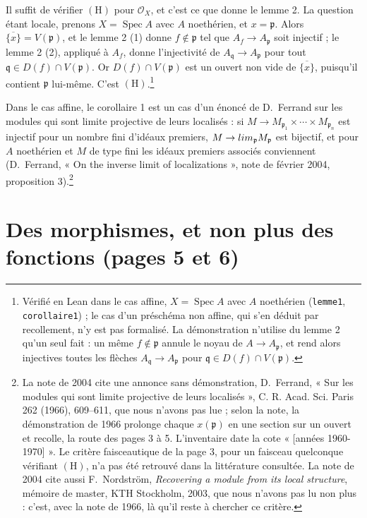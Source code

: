 \documentclass[11pt,a4paper]{article}
\begin{document}
Il suffit de vérifier $(\mathrm{H})$ pour $\mathcal{O}_X$, et c'est ce que
donne le lemme 2. La question étant locale, prenons $X = \operatorname{Spec} A$ avec
$A$ noethérien, et $x = \mathfrak p$. Alors $\overline{\{x\}} = V(\mathfrak p)$,
et le lemme 2 (1) donne $f \notin \mathfrak p$ tel que
$A_f \to A_{\mathfrak p}$ soit injectif ; le lemme 2 (2), appliqué à $A_f$,
donne l'injectivité de $A_{\mathfrak q} \to A_{\mathfrak p}$ pour tout
$\mathfrak q \in D(f) \cap V(\mathfrak p)$. Or $D(f) \cap V(\mathfrak p)$ est
un ouvert non vide de $\overline{\{x\}}$, puisqu'il contient $\mathfrak p$
lui-même. C'est $(\mathrm{H})$.\footnote{Vérifié en Lean dans le cas
affine, $X = \operatorname{Spec} A$ avec $A$ noethérien
(\texttt{lemme1}, \texttt{corollaire1}) ; le cas d'un préschéma non affine,
qui s'en déduit par recollement, n'y est pas formalisé. La démonstration
n'utilise du lemme 2 qu'un seul fait : un même $f \notin \mathfrak p$ annule
le noyau de $A \to A_{\mathfrak p}$, et rend alors injectives toutes les
flèches $A_{\mathfrak q} \to A_{\mathfrak p}$ pour
$\mathfrak q \in D(f) \cap V(\mathfrak p)$.}

Dans le cas affine, le corollaire 1 est un cas d'un énoncé de D.~Ferrand sur
les modules qui sont limite projective de leurs localisés : si
$M \to M_{\mathfrak p_1} \times \cdots \times M_{\mathfrak p_n}$ est
injectif pour un nombre fini d'idéaux premiers, $M \to
\varprojlim_{\mathfrak p} M_{\mathfrak p}$ est bijectif, et pour $A$
noethérien et $M$ de type fini les idéaux premiers associés conviennent
(D.~Ferrand, « On the inverse limit of localizations », note de février
2004, proposition 3).\footnote{La note de 2004 cite une annonce sans
démonstration, D.~Ferrand, « Sur les modules qui sont limite projective de
leurs localisés », C. R. Acad. Sci. Paris 262 (1966), 609--611, que nous
n'avons pas lue ; selon la note, la démonstration de 1966 prolonge chaque
$x(\mathfrak p)$ en une section sur un ouvert et recolle, la route des pages 3
à 5. L'inventaire date la cote « [années 1960-1970] ». Le critère faisceautique
de la page 3, pour un faisceau quelconque vérifiant $(\mathrm{H})$, n'a pas
été retrouvé dans la littérature consultée. La note de 2004 cite aussi
F.~Nordström, \emph{Recovering a module from its local structure}, mémoire de
master, KTH Stockholm, 2003, que nous n'avons pas lu non plus : c'est, avec
la note de 1966, là qu'il reste à chercher ce critère.}

\section*{Des morphismes, et non plus des fonctions (pages 5 et 6)}
\end{document}

